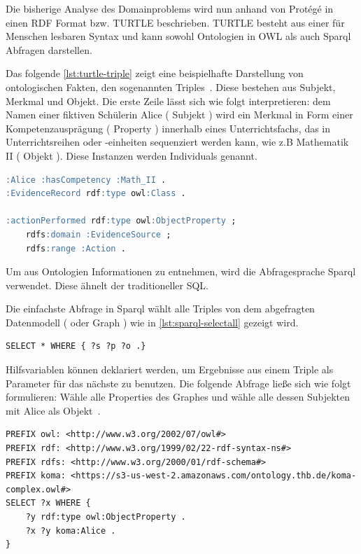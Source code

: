 \documentclass[
12pt,
english,
ngerman,
headsepline,
twoside,
openright,
numbers=noenddot,version=first
]{scrreprt}
\begin{document}

Die bisherige Analyse des Domainproblems wird nun anhand von Protégé in einen \acrfull{RDF} Format bzw. \acrfull{TURTLE} beschrieben. \acrshort{TURTLE} besteht aus einer für Menschen lesbaren Syntax und kann sowohl Ontologien in \acrshort{OWL} als auch \acrshort{Sparql} Abfragen darstellen. 

Das folgende \autoref{lst:turtle-triple} zeigt eine beispielhafte Darstellung von ontologischen Fakten, den sogenannten \glqq Triples\grqq\ . Diese bestehen aus Subjekt, Merkmal und Objekt. Die erste Zeile lässt sich wie folgt interpretieren: dem Namen einer fiktiven Schülerin Alice ( Subjekt ) wird ein Merkmal in Form einer Kompetenzausprägung ( Property ) innerhalb eines Unterrichtsfachs, das in Unterrichtsreihen oder -einheiten sequenziert werden kann, wie z.B Mathematik II ( Objekt ). Diese Instanzen werden Individuals genannt.

\begin{lstlisting}[language=SQL,caption={Darstellung von Triples in TURTLE},label={lst:turtle-triple}]
:Alice :hasCompetency :Math_II .
:EvidenceRecord rdf:type owl:Class .

:actionPerformed rdf:type owl:ObjectProperty ;
	rdfs:domain :EvidenceSource ;
	rdfs:range :Action .
\end{lstlisting}

Um aus Ontologien Informationen zu entnehmen, wird die Abfragesprache \acrfull{Sparql} 
verwendet. Diese ähnelt der traditioneller SQL. 

Die einfachste Abfrage in Sparql wählt alle Triples von dem abgefragten Datenmodell ( oder Graph ) wie in  \autoref{lst:sparql-selectall} gezeigt wird.

\begin{lstlisting}[language=Sparql,caption={Sparql SELECT ALL},label={lst:sparql-selectall}]
SELECT * WHERE { ?s ?p ?o .}
\end{lstlisting}

Hilfsvariablen können deklariert werden, um Ergebnisse aus einem Triple als Parameter für das nächste zu benutzen. Die folgende Abfrage ließe sich wie folgt formulieren: \glqq Wähle alle Properties des Graphes und wähle alle dessen Subjekten mit Alice als Objekt\grqq\ . \\
\begin{lstlisting}
PREFIX owl: <http://www.w3.org/2002/07/owl#>
PREFIX rdf: <http://www.w3.org/1999/02/22-rdf-syntax-ns#>
PREFIX rdfs: <http://www.w3.org/2000/01/rdf-schema#>
PREFIX koma: <https://s3-us-west-2.amazonaws.com/ontology.thb.de/koma-complex.owl#>
SELECT ?x WHERE {
	?y rdf:type owl:ObjectProperty .
	?x ?y koma:Alice .
}
\end{lstlisting}
\end{document}
